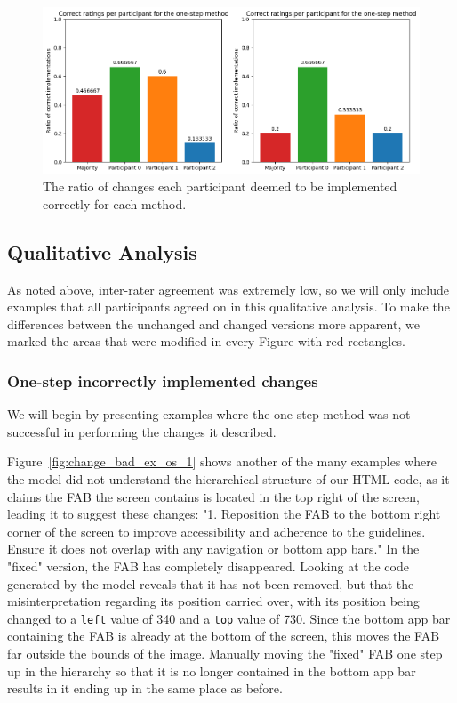 \documentclass[11pt,titlepage,oneside,openany]{book}
\begin{document}
\begin{figure}[t]
	\centering
	\includegraphics[width=\textwidth]{figures/change_implementation_survey_results.png}
	\caption{The ratio of changes each participant deemed to be implemented correctly for each method.}
	\label{fig:change_imp}
\end{figure}

\subsection{Qualitative Analysis}

As noted above, inter-rater agreement was extremely low, so we will only include examples that all participants agreed on in this qualitative analysis. To make the differences between the unchanged and changed versions more apparent, we marked the areas that were modified in every Figure with red rectangles.

\subsubsection{One-step incorrectly implemented changes}

We will begin by presenting examples where the one-step method was not successful in performing the changes it described.

Figure~\ref{fig:change_bad_ex_os_1} shows another of the many examples where the model did not understand the hierarchical structure of our HTML code, as it claims the FAB the screen contains is located in the top right of the screen, leading it to suggest these changes: "1. Reposition the FAB to the bottom right corner of the screen to improve accessibility and adherence to the guidelines. Ensure it does not overlap with any navigation or bottom app bars." In the "fixed" version, the FAB has completely disappeared. Looking at the code generated by the model reveals that it has not been removed, but that the misinterpretation regarding its position carried over, with its position being changed to a \texttt{left} value of 340 and a \texttt{top} value of 730. Since the bottom app bar containing the FAB is already at the bottom of the screen, this moves the FAB far outside the bounds of the image. Manually moving the "fixed" FAB one step up in the hierarchy so that it is no longer contained in the bottom app bar results in it ending up in the same place as before.
\end{document}
